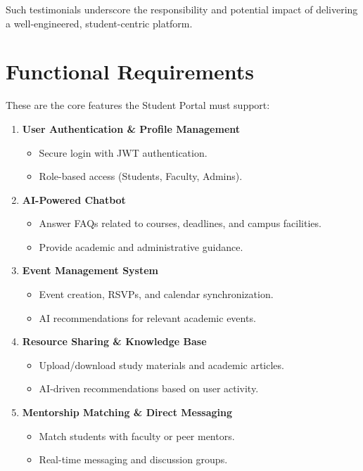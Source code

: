 Such testimonials underscore the responsibility and potential impact of delivering a well-engineered, student-centric platform.


\section{Functional Requirements}

These are the core features the Student Portal must support:

\begin{enumerate}
    \item \textbf{User Authentication \& Profile Management}
    \begin{itemize}
        \item Secure login with JWT authentication.
        \item Role-based access (Students, Faculty, Admins).
    \end{itemize}

    \item \textbf{AI-Powered Chatbot}
    \begin{itemize}
        \item Answer FAQs related to courses, deadlines, and campus facilities.
        \item Provide academic and administrative guidance.
    \end{itemize}

    \item \textbf{Event Management System}
    \begin{itemize}
        \item Event creation, RSVPs, and calendar synchronization.
        \item AI recommendations for relevant academic events.
    \end{itemize}

    \item \textbf{Resource Sharing \& Knowledge Base}
    \begin{itemize}
        \item Upload/download study materials and academic articles.
        \item AI-driven recommendations based on user activity.
    \end{itemize}

    \item \textbf{Mentorship Matching \& Direct Messaging}
    \begin{itemize}
        \item Match students with faculty or peer mentors.
        \item Real-time messaging and discussion groups.
    \end{itemize}


\end{enumerate}
